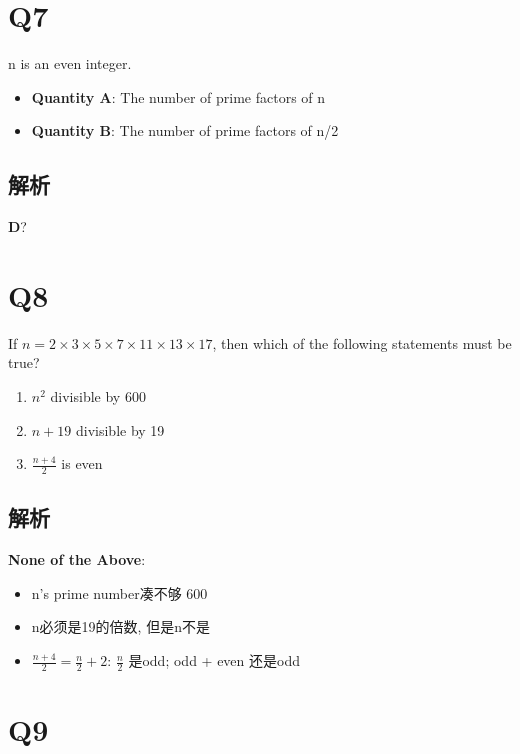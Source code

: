 \section{Q7}

  n is an even integer.

  \begin{itemize}
    \item \textbf{Quantity A}: The number of prime factors of n
    \item \textbf{Quantity B}: The number of prime factors of n/2
  \end{itemize}

  \subsection{解析}

    \textbf{D}?

\section{Q8}

  If $ n= 2 \times 3 \times 5 \times 7 \times 11 \times 13 \times 17 $,
  then which of the following statements must be true?

  \begin{enumerate}
    \item $ n^{2} $ divisible by 600
    \item $ n + 19 $ divisible by 19
    \item $ \frac{n + 4}{2} $ is even
  \end{enumerate}

  \subsection{解析}

    \textbf{None of the Above}:

    \begin{itemize}
      \item n's prime number凑不够 $ 600 $
      \item n必须是19的倍数, 但是n不是
      \item $ \frac{n + 4}{2} = \frac{n}{2} + 2 $: $ \frac{n}{2} $ 是odd;
      odd + even 还是odd
    \end{itemize}

\section{Q9}


